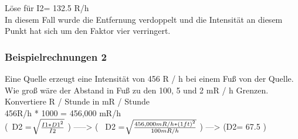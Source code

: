 Löse für I2= 132.5 R/h \\
In diesem Fall wurde die Entfernung verdoppelt und die Intensität an diesem Punkt hat sich um den Faktor vier verringert.

\subsubsection{Beispielrechnungen 2}
Eine Quelle erzeugt eine Intensität von 456 R / h bei einem Fuß von der Quelle. Wie groß wäre der Abstand in Fuß zu den 100, 5 und 2 mR / h Grenzen.\\
Konvertiere R / Stunde in mR / Stunde\\
456R/h * 1000 = 456,000 mR/h\\
\big (\ D2 = $\sqrt[\leftroot{3}\uproot{3}]{\tfrac{I1*D1^2}{I2}}$  \big) -----> \Big(
\ D2 = $\sqrt[\leftroot{3}\uproot{3}]{\tfrac{456,000 mR/h * (1ft)^2}{100 mR/h}}$ \Big) ---> \Bigg(D2= 67.5 \Bigg) 
